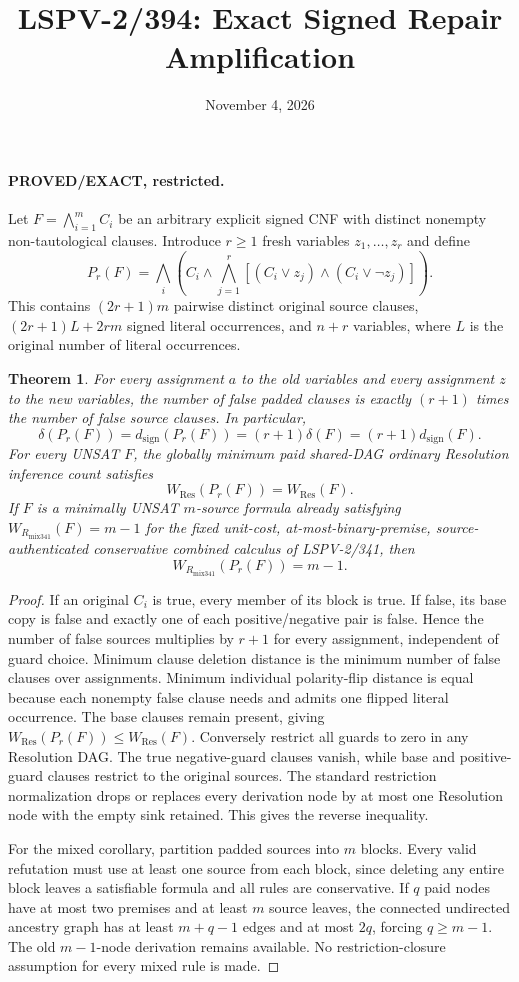 \documentclass[11pt]{article}
\title{LSPV-2/394: Exact Signed Repair Amplification}
\date{November 4, 2026}
\newtheorem{theorem}{Theorem}
\begin{document}
\maketitle
\paragraph{PROVED/EXACT, restricted.}
Let $F=\bigwedge_{i=1}^{m}C_i$ be an arbitrary explicit signed CNF with distinct nonempty non-tautological clauses. Introduce $r\ge1$ fresh variables $z_1,\dots,z_r$ and define
\[
P_r(F)=\bigwedge_i\left(C_i\land\bigwedge_{j=1}^{r}
[(C_i\lor z_j)\land(C_i\lor\neg z_j)]\right).
\]
This contains $(2r+1)m$ pairwise distinct original source clauses, $(2r+1)L+2rm$ signed literal occurrences, and $n+r$ variables, where $L$ is the original number of literal occurrences.
\begin{theorem}
For every assignment $a$ to the old variables and every assignment $z$ to the new variables, the number of false padded clauses is exactly $(r+1)$ times the number of false source clauses. In particular,
\[
\delta(P_r(F))=d_{\mathrm{sign}}(P_r(F))=(r+1)\delta(F)=(r+1)d_{\mathrm{sign}}(F).
\]
For every UNSAT $F$, the globally minimum paid shared-DAG \emph{ordinary Resolution} inference count satisfies
\[
W_{\mathrm{Res}}(P_r(F))=W_{\mathrm{Res}}(F).
\]
If $F$ is a minimally UNSAT $m$-source formula already satisfying $W_{R_{\mathrm{mix341}}}(F)=m-1$ for the fixed unit-cost, at-most-binary-premise, source-authenticated conservative combined calculus of LSPV-2/341, then
\[
W_{R_{\mathrm{mix341}}}(P_r(F))=m-1.
\]
\end{theorem}
\begin{proof}
If an original $C_i$ is true, every member of its block is true. If false, its base copy is false and exactly one of each positive/negative pair is false. Hence the number of false sources multiplies by $r+1$ for every assignment, independent of guard choice. Minimum clause deletion distance is the minimum number of false clauses over assignments. Minimum individual polarity-flip distance is equal because each nonempty false clause needs and admits one flipped literal occurrence. The base clauses remain present, giving $W_{\mathrm{Res}}(P_r(F))\le W_{\mathrm{Res}}(F)$. Conversely restrict all guards to zero in any Resolution DAG. The true negative-guard clauses vanish, while base and positive-guard clauses restrict to the original sources. The standard restriction normalization drops or replaces every derivation node by at most one Resolution node with the empty sink retained. This gives the reverse inequality.

For the mixed corollary, partition padded sources into $m$ blocks. Every valid refutation must use at least one source from each block, since deleting any entire block leaves a satisfiable formula and all rules are conservative. If $q$ paid nodes have at most two premises and at least $m$ source leaves, the connected undirected ancestry graph has at least $m+q-1$ edges and at most $2q$, forcing $q\ge m-1$. The old $m-1$-node derivation remains available. No restriction-closure assumption for every mixed rule is made.
\end{proof}
\end{document}
